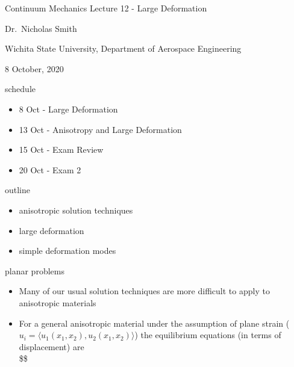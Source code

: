 \documentclass[
  letterpaper,
  ignorenonframetext,
  aspectratio=43,
  handout,
  12pt]{beamer}
\author{}
\date{}
\providecommand{\tightlist}{%
  \setlength{\itemsep}{0pt}\setlength{\parskip}{0pt}}
\providecommand{\tightlist}{%
\setlength{\itemsep}{0pt}\setlength{\parskip}{0pt}}
\begin{document}
\begin{frame}{Continuum Mechanics}
\protect\hypertarget{continuum-mechanics}{}
Lecture 12 - Large Deformation

Dr.~Nicholas Smith

Wichita State University, Department of Aerospace Engineering

8 October, 2020
\end{frame}

\begin{frame}{schedule}
\protect\hypertarget{schedule}{}
\begin{itemize}
\tightlist
\item
  8 Oct - Large Deformation
\item
  13 Oct - Anisotropy and Large Deformation
\item
  15 Oct - Exam Review
\item
  20 Oct - Exam 2
\end{itemize}
\end{frame}

\begin{frame}{outline}
\protect\hypertarget{outline}{}
\begin{itemize}
\tightlist
\item
  anisotropic solution techniques
\item
  large deformation
\item
  simple deformation modes
\end{itemize}
\end{frame}

\begin{frame}{planar problems}
\protect\hypertarget{planar-problems}{}
\begin{itemize}
\tightlist
\item
  Many of our usual solution techniques are more difficult to apply to
  anisotropic materials
\item
  For a general anisotropic material under the assumption of plane
  strain (\(u_i = \langle u_1(x_1,x_2), u_2(x_1,x_2)\rangle\)) the
  equilibrium equations (in terms of displacement) are \[
  \]\hspace{-.5in}  \$\$
\end{itemize}
\end{frame}
\end{document}
